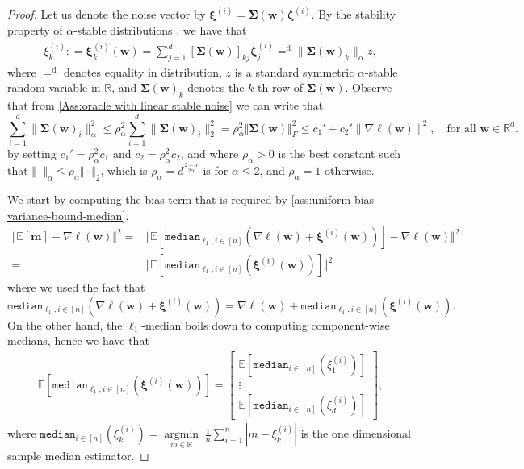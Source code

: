 \documentclass[10pt]{article} %
\renewcommand{\vec}[1]{\bm{#1}}
\newcommand{\bw}{\bm{w}}
\DeclareMathOperator{\argmininn}{argmin}
\newcommand{\argmin}[1]{ \underset{#1}{\argmininn} \;}
\newcommand{\R}{\mathbb{R}}
\newcommand{\E}[1]{\mathbb{E}\left[#1\right] }
\newcommand{\median}{\texttt{median}}
\newcommand{\samplemedian}[1]{\texttt{median}_{#1,i\in[n]}}
\begin{document}
\begin{proof}
    
Let us denote the noise vector by $\vec{\xi}^{(i)} = \vec{\Sigma}(\bw)\vec{\zeta}^{(i)}$. By the stability property of $\alpha$-stable distributions \citep[Proposition 1.3]{Nolan2020}, we have that \begin{align}
    \label{eqn:marg_dist}
   {\xi}_k^{(i)}: =\vec{\xi}_k^{(i)}(\vec{w}) = \sum_{j=1}^d [\vec{\Sigma}(\vec{w})]_{kj} \vec{\zeta}^{(i)}_j =^{\mathrm{d}}  \|\vec{\Sigma}(\vec{w})_k\|_{\alpha} z ,
\end{align}
where $=^{\mathrm{d}}$ denotes equality in distribution, $z$ is a standard symmetric $\alpha$-stable random variable in $\mathbb{R}$, and $\vec{\Sigma}(\vec{w})_k$ denotes the $k$-th row of $\vec{\Sigma}(\vec{w})$.
Observe that from \cref{Ass:oracle with linear stable noise} we can write that
\begin{equation}\label{eqn:frobenius to alpha norm}
    \sum_{i=1}^d \|\vec{\Sigma}(\vec{w})_i\|_{\alpha}^2 
    \leq
    \rho_\alpha^2\sum_{i=1}^d \|\vec{\Sigma}(\vec{w})_i\|_{2}^2 
    =
    \rho_\alpha^2\Vert \vec{\Sigma}(\vec{w}) \Vert_F^2
    \leq 
    c_1' + c_2' \|\nabla \ell(\vec{w})\|^2, \quad \mbox{for all  } \vec{w} \in \R^d.
\end{equation}
by setting $c_1' =\rho_\alpha^2 c_1$ and $c_2 = \rho_\alpha^2 c_2$, and where $\rho_\alpha>0$ is the best constant such that $\Vert \cdot \Vert_\alpha \leq \rho_\alpha \Vert \cdot \Vert_2$, which is $\rho_\alpha = d^{\tfrac{2-\alpha}{2\alpha}}$ is for $\alpha \leq 2$, and $\rho_\alpha=1$ otherwise.

We start by computing the bias term that is required by \cref{ass:uniform-bias-variance-bound-median}.
\begin{align*}
   \Vert \E{\vec{m}} - \nabla \ell(\vec{w}) \Vert^2 =& \Vert \E{ \samplemedian{\ell_1}\left(\nabla \ell(\vec{w}) + \vec{\xi}^{(i)}(\vec{w})\right) } - \nabla \ell(\vec{w}) \Vert^2 \\
   =& \Vert \E{ \samplemedian{\ell_1}\left(\vec{\xi}^{(i)}(\vec{w}) \right) }  \Vert^2 %
\end{align*}
where we used the fact that 
$$\samplemedian{\ell_1}\left( \nabla \ell(\vec{w}) + \vec{\xi}^{(i)}(\vec{w}) \right) = \nabla \ell(\vec{w}) + 
\samplemedian{\ell_1}\left( \vec{\xi}^{(i)}(\vec{w})\right).$$
% 
On the other hand, the $\ell_1$-median boils down to computing component-wise medians, hence we have that
\begin{align*}
    \E{\samplemedian{\ell_1}\left( \vec{\xi}^{(i)}(\vec{w})\right) }= \begin{bmatrix}
\E{\median_{i\in[n]}\left( \xi_1^{(i)}\right)  } \\
\vdots \\
\E{\median_{i\in[n]}\left( \xi_d^{(i)}\right) }
\end{bmatrix},
\end{align*}
where $\median_{i\in[n]}(\xi_k^{(i)}) = \argmin{m \in \mathbb{R}} \frac1{n} \sum_{i=1}^n |m-\xi_k^{(i)}| $ is the one dimensional sample median estimator. 


\end{proof}
\end{document}
